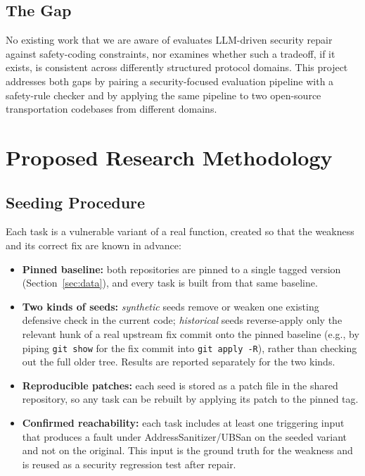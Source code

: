 \documentclass[12pt]{article}
\begin{document}
\subsection{The Gap}
No existing work that we are aware of evaluates LLM-driven security repair against safety-coding constraints, nor examines whether such a tradeoff, if it exists, is consistent across differently structured protocol domains. This project addresses both gaps by pairing a security-focused evaluation pipeline with a safety-rule checker and by applying the same pipeline to two open-source transportation codebases from different domains.

\section{Proposed Research Methodology}
\label{sec:method}

\subsection{Seeding Procedure}
Each task is a vulnerable variant of a real function, created so that the weakness and its correct fix are known in advance:
\begin{itemize}
    \item \textbf{Pinned baseline:} both repositories are pinned to a single tagged version (Section~\ref{sec:data}), and every task is built from that same baseline.
    \item \textbf{Two kinds of seeds:} \emph{synthetic} seeds remove or weaken one existing defensive check in the current code; \emph{historical} seeds reverse-apply only the relevant hunk of a real upstream fix commit onto the pinned baseline (e.g., by piping \texttt{git show} for the fix commit into \texttt{git apply -R}), rather than checking out the full older tree. Results are reported separately for the two kinds.
    \item \textbf{Reproducible patches:} each seed is stored as a patch file in the shared repository, so any task can be rebuilt by applying its patch to the pinned tag.
    \item \textbf{Confirmed reachability:} each task includes at least one triggering input that produces a fault under AddressSanitizer/UBSan on the seeded variant and not on the original. This input is the ground truth for the weakness and is reused as a security regression test after repair.
\end{itemize}
\end{document}
